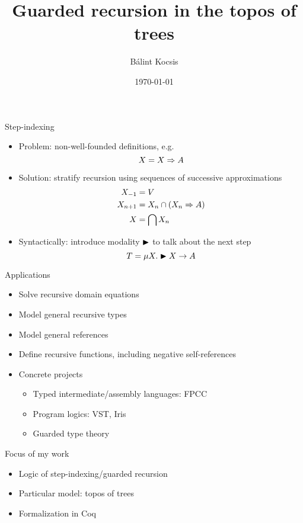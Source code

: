\documentclass{beamer}
\title{Guarded recursion in the topos of trees}
\author{Bálint Kocsis}
\institute{Radboud University}
\date{\today}
\begin{document}
\maketitle

\begin{frame}{Step-indexing}
\begin{itemize}
    \item<1-> Problem: non-well-founded definitions, e.g.
    \[ X = X \Rightarrow A \]
    \item<2-> Solution: stratify recursion using sequences of successive approximations
    \begin{align*}
        X_{-1} &= V \\
        X_{n+1} &= X_n \cap (X_n \Rightarrow A) \\
        X &= \bigcap{X_n} \\
    \end{align*}
    \item<3-> \vspace{-20pt}
    Syntactically: introduce modality $\blacktriangleright$ to talk about the next step
    \[ T = \mu X. \blacktriangleright{X} \to A \]
\end{itemize}
\end{frame}

\begin{frame}{Applications}
\begin{itemize}
    \item Solve recursive domain equations
    \item Model general recursive types
    \item Model general references
    \item Define recursive functions, including negative self-references
    \item Concrete projects
    \begin{itemize}
        \item Typed intermediate/assembly languages: FPCC
        \item Program logics: VST, Iris
        \item Guarded type theory
    \end{itemize}
\end{itemize}
\end{frame}

\begin{frame}{Focus of my work}
\begin{itemize}
    \item Logic of step-indexing/guarded recursion
    \item Particular model: topos of trees
    \item Formalization in Coq
\end{itemize}
\end{frame}
\end{document}
